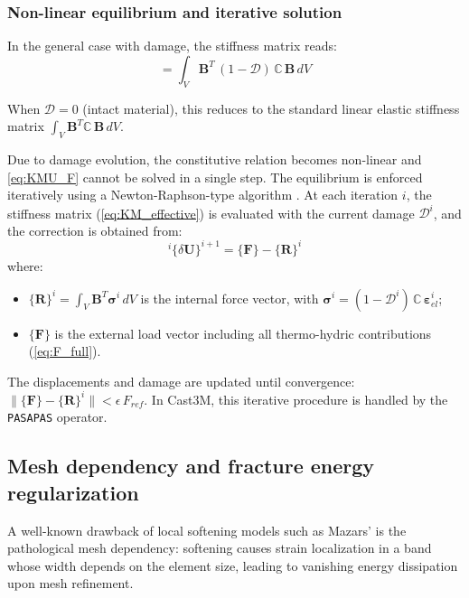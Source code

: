 \subsubsection{Non-linear equilibrium and iterative solution}

In the general case with damage, the stiffness matrix reads:
\begin{equation}
    [\mathbf{K}_M] = \int_V \mathbf{B}^T\,
    (1-\mathcal{D})\,\mathbb{C}\,\mathbf{B}\,dV
    \label{eq:KM_effective}
\end{equation}

When $\mathcal{D}=0$ (intact material), this reduces to the standard linear elastic stiffness matrix $\int_V \mathbf{B}^T\mathbb{C}\,\mathbf{B}\,dV$.

Due to damage evolution, the constitutive relation becomes non-linear and \cref{eq:KMU_F} cannot be solved in a single step. The equilibrium is enforced iteratively using a Newton-Raphson-type algorithm \cite{dalpont2020}. At each iteration $i$, the stiffness matrix (\cref{eq:KM_effective}) is evaluated with the current damage $\mathcal{D}^i$, and the correction is obtained from:
\begin{equation}
    [\mathbf{K}_M]^i \{\delta\mathbf{U}\}^{i+1} 
    = \{\mathbf{F}\} - \{\mathbf{R}\}^i
    \label{eq:NR_iteration}
\end{equation}
where:
\begin{itemize}
    \item $\{\mathbf{R}\}^i = \int_V \mathbf{B}^T \boldsymbol{\sigma}^i\,dV$ is the internal force vector, with $\boldsymbol{\sigma}^i = (1-\mathcal{D}^i)\,\mathbb{C}\, \boldsymbol{\varepsilon}^i_{el}$;
    
    \item $\{\mathbf{F}\}$ is the external load vector including all thermo-hydric contributions (\cref{eq:F_full}).
\end{itemize}

The displacements and damage are updated until convergence: $\|\{\mathbf{F}\} - \{\mathbf{R}\}^i\| < \epsilon\,F_{ref}$. In Cast3M, this iterative procedure is handled by the \texttt{PASAPAS} operator.

\subsection{Mesh dependency and fracture energy regularization}

A well-known drawback of local softening models such as Mazars' is the pathological mesh dependency: softening causes strain localization in a band whose width depends on the element size, leading to vanishing energy dissipation upon mesh refinement.

